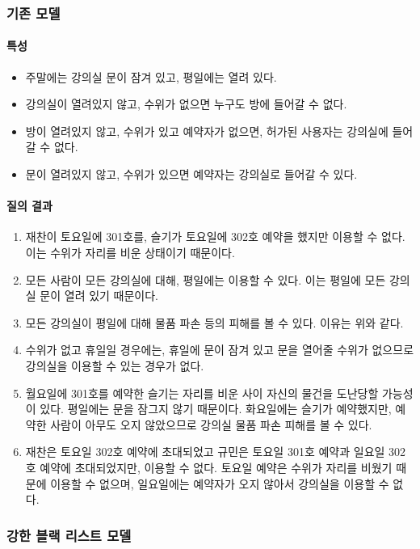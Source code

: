 \documentclass[11pt,a4paper]{article}
\begin{document}
\subsubsection{기존 모델}

\paragraph{특성}
\begin{itemize}
\item 주말에는 강의실 문이 잠겨 있고, 평일에는 열려 있다.
\item 강의실이 열려있지 않고, 수위가 없으면 누구도 방에 들어갈 수 없다.
\item 방이 열려있지 않고, 수위가 있고 예약자가 없으면, 허가된 사용자는 강의실에 들어갈 수 없다.
\item 문이 열려있지 않고, 수위가 있으면 예약자는 강의실로 들어갈 수 있다.
\end{itemize}

\paragraph{질의 결과}
\begin{enumerate}
\item 재찬이 토요일에 301호를, 슬기가 토요일에 302호 예약을 했지만 이용할 수 없다. 이는 수위가 자리를 비운 상태이기 때문이다.
\item 모든 사람이 모든 강의실에 대해, 평일에는 이용할 수 있다. 이는 평일에 모든 강의실 문이 열려 있기 때문이다.
\item 모든 강의실이 평일에 대해 물품 파손 등의 피해를 볼 수 있다. 이유는 위와 같다.
\item 수위가 없고 휴일일 경우에는, 휴일에 문이 잠겨 있고 문을 열어줄 수위가 없으므로 강의실을 이용할 수 있는 경우가 없다.
\item 월요일에 301호를 예약한 슬기는 자리를 비운 사이 자신의 물건을 도난당할 가능성이 있다. 평일에는 문을 잠그지 않기 때문이다. 화요일에는 슬기가 예약했지만, 예약한 사람이 아무도 오지 않았으므로 강의실 물품 파손 피해를 볼 수 있다.
\item 재찬은 토요일 302호 예약에 초대되었고 규민은 토요일 301호 예약과 일요일 302호 예약에 초대되었지만, 이용할 수 없다. 토요일 예약은 수위가 자리를 비웠기 때문에 이용할 수 없으며, 일요일에는 예약자가 오지 않아서 강의실을 이용할 수 없다.
\end{enumerate}

\subsubsection{강한 블랙 리스트 모델}
\end{document}
